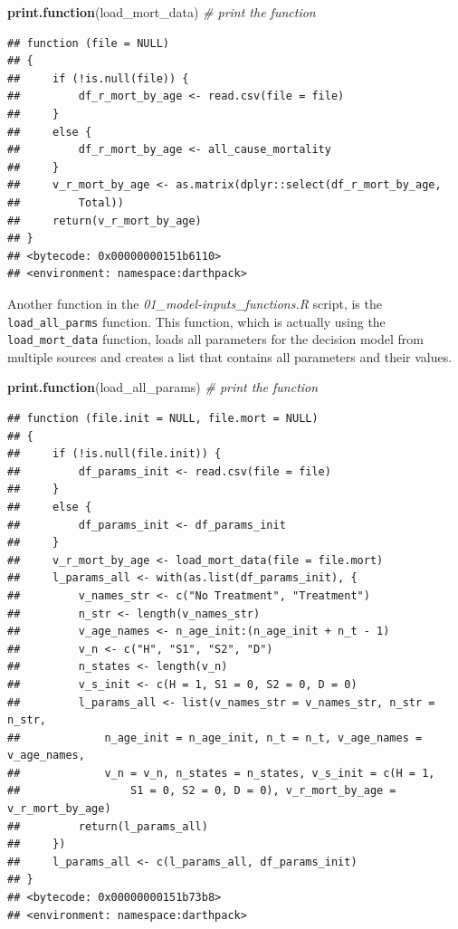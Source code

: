 \documentclass[]{book}
\newenvironment{Shaded}{\begin{snugshade}}{\end{snugshade}}
\newcommand{\CommentTok}[1]{\textcolor[rgb]{0.56,0.35,0.01}{\textit{#1}}}
\newcommand{\KeywordTok}[1]{\textcolor[rgb]{0.13,0.29,0.53}{\textbf{#1}}}
\newcommand{\NormalTok}[1]{#1}
\begin{document}
\begin{Shaded}
\begin{Highlighting}[]
\KeywordTok{print.function}\NormalTok{(load_mort_data) }\CommentTok{# print the function}
\end{Highlighting}
\end{Shaded}

\begin{verbatim}
## function (file = NULL) 
## {
##     if (!is.null(file)) {
##         df_r_mort_by_age <- read.csv(file = file)
##     }
##     else {
##         df_r_mort_by_age <- all_cause_mortality
##     }
##     v_r_mort_by_age <- as.matrix(dplyr::select(df_r_mort_by_age, 
##         Total))
##     return(v_r_mort_by_age)
## }
## <bytecode: 0x00000000151b6110>
## <environment: namespace:darthpack>
\end{verbatim}

Another function in the \emph{01\_model-inputs\_functions.R} script, is the \texttt{load\_all\_parms} function. This function, which is actually using the \texttt{load\_mort\_data} function, loads all parameters for the decision model from multiple sources and creates a list that contains all parameters and their values.

\begin{Shaded}
\begin{Highlighting}[]
\KeywordTok{print.function}\NormalTok{(load_all_params)  }\CommentTok{# print the function}
\end{Highlighting}
\end{Shaded}

\begin{verbatim}
## function (file.init = NULL, file.mort = NULL) 
## {
##     if (!is.null(file.init)) {
##         df_params_init <- read.csv(file = file)
##     }
##     else {
##         df_params_init <- df_params_init
##     }
##     v_r_mort_by_age <- load_mort_data(file = file.mort)
##     l_params_all <- with(as.list(df_params_init), {
##         v_names_str <- c("No Treatment", "Treatment")
##         n_str <- length(v_names_str)
##         v_age_names <- n_age_init:(n_age_init + n_t - 1)
##         v_n <- c("H", "S1", "S2", "D")
##         n_states <- length(v_n)
##         v_s_init <- c(H = 1, S1 = 0, S2 = 0, D = 0)
##         l_params_all <- list(v_names_str = v_names_str, n_str = n_str, 
##             n_age_init = n_age_init, n_t = n_t, v_age_names = v_age_names, 
##             v_n = v_n, n_states = n_states, v_s_init = c(H = 1, 
##                 S1 = 0, S2 = 0, D = 0), v_r_mort_by_age = v_r_mort_by_age)
##         return(l_params_all)
##     })
##     l_params_all <- c(l_params_all, df_params_init)
## }
## <bytecode: 0x00000000151b73b8>
## <environment: namespace:darthpack>
\end{verbatim}
\end{document}
